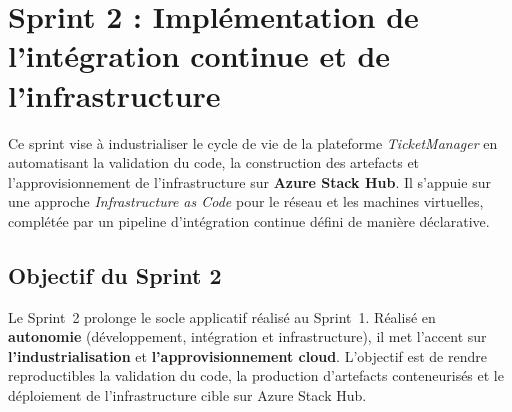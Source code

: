 
\section[Sprint 2 : Implémentation de l'intégration continue et de l'infrastructure]%
{Sprint 2 : Implémentation de l'intégration continue et de l'infrastructure}

Ce sprint vise à industrialiser le cycle de vie de la plateforme \textit{TicketManager} en
automatisant la validation du code, la construction des artefacts et l'approvisionnement de
l'infrastructure sur \textbf{Azure Stack Hub}. Il s'appuie sur une approche \textit{Infrastructure
as Code} pour le réseau et les machines virtuelles, complétée par un pipeline d'intégration
continue défini de manière déclarative.


\subsection{Objectif du Sprint 2}

Le Sprint~2 prolonge le socle applicatif réalisé au Sprint~1. Réalisé en \textbf{autonomie}
(développement, intégration et infrastructure), il met l'accent sur
\textbf{l'industrialisation} et \textbf{l'approvisionnement cloud}. L'objectif est de rendre
reproductibles la validation du code, la production d'artefacts conteneurisés et le déploiement
de l'infrastructure cible sur Azure Stack Hub.

